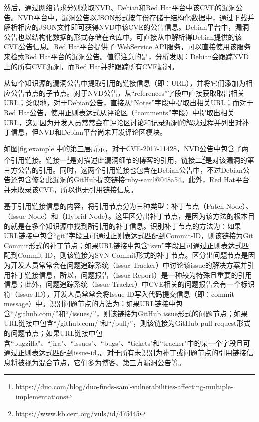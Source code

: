 然后，\tool 通过网络请求分别获取NVD、Debian和Red Hat平台中该CVE的漏洞公告。NVD平台中，漏洞公告以JSON形式按年份存储于结构化数据\cite{nvd-feed}中，\tool 通过下载并解析相应的JSON文件即可获得NVD中该CVE的公告信息。Debian平台中，漏洞公告也以结构化数据的形式存储在仓库\cite{debian-repo}中，\tool 可直接从中解析得Debian提供的该CVE公告信息。Red Hat平台提供了 WebService API\cite{redhat-api}服务，\tool 可以直接使用该服务来检索Red Hat平台的漏洞公告。值得注意的是，分析发现：Debian会跟踪NVD上的所有CVE漏洞，而Red Hat并非跟踪所有CVE漏洞。

\tool 从每个知识源的漏洞公告中提取引用的链接信息（即：URL），并将它们添加为相应公告节点的子节点。对于NVD公告，\tool 从“references”字段中直接获取取出相关URL；类似地，对于Debian公告，\tool 直接从“Notes”字段中提取出相关URL；而对于Red Hat公告，\tool 使用正则表达式从评论区（“comments”字段）中提取出相关URL，这是因为开发人员常常会在评论区讨论和记录漏洞的解决过程并列出对补丁信息，但NVD和Debian平台尚未开发评论区模块。

\begin{exmp}
如图\ref{fig:example}中的第三层所示，对于CVE-2017-11428，NVD公告中包含了两个引用链接。链接一\footnote{https://duo.com/blog/duo-finds-saml-vulnerabilities-affecting-multiple-implementations}是对描述此漏洞细节的博客的引用，链接二\footnote{https://www.kb.cert.org/vuls/id/475445}是对该漏洞的第三方公告的引用。同时，这两个引用链接也包含在Debian公告中，不过Debian公告还包含修复此漏洞的GitHub提交链接ruby-saml@048a54\cite{ruby-saml-1}。此外，Red Hat平台并未收录该CVE，所以也无引用链接信息。
\end{exmp}

\tool 基于引用链接信息的内容，将引用节点分为三种类型：补丁节点（Patch Node）、（Issue Node）和（Hybrid Node）。这里区分出补丁节点，是因为该方法的根本目的就是在多个知识源中找到所引用的补丁信息。识别补丁节点的方法为：如果URL链接中包含“git”字段且可通过正则表达式匹配到Commit-ID，则该链接为Git Commit形式的补丁节点；如果URL链接中包含“svn”字段且可通过正则表达式匹配到Commit-ID，则该链接为SVN Commit形式的补丁节点。区分出问题节点是因为开发人员常常会在问题追踪系统（Issue Tracker）中讨论该issue的解决方案并引用补丁链接信息，所以，问题报告（Issue Report）是一种较为特殊且重要的引用信息；此外，问题追踪系统（Issue Tracker）中CVE相关的问题报告会有一个标识符（Issue-ID），开发人员常常会将Issue-ID写入代码提交信息（即：commit message）中。识别问题节点的方法为：如果URL链接中包含``/github.com/''和``/issues/''，则该链接为GitHub issue形式的问题节点；如果URL链接中包含``/github.com/''和``/pull/''，则该链接为GitHub pull request形式的问题节点；如果URL链接中包含``bugzilla"、``jira"、``issues"、``bugs"、``tickets"和``tracker"中的某一个字段且可通过正则表达式匹配到issue-id，。对于所有未识别为补丁或问题节点的引用链接信息将被视为混合节点，它们多为博客、第三方漏洞公告等。

